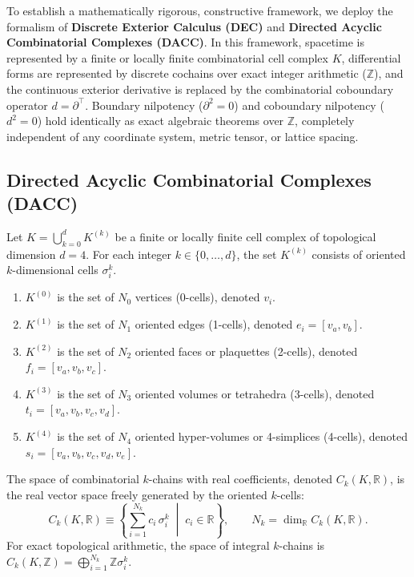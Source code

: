To establish a mathematically rigorous, constructive framework, we deploy the formalism of \textbf{Discrete Exterior Calculus (DEC)} \cite{Desbrun2005} and \textbf{Directed Acyclic Combinatorial Complexes (DACC)}. In this framework, spacetime is represented by a finite or locally finite combinatorial cell complex $K$, differential forms are represented by discrete cochains over exact integer arithmetic ($\mathbb{Z}$), and the continuous exterior derivative is replaced by the combinatorial coboundary operator $d = \partial^\top$. Boundary nilpotency ($\partial^2 = 0$) and coboundary nilpotency ($d^2 = 0$) hold identically as exact algebraic theorems over $\mathbb{Z}$, completely independent of any coordinate system, metric tensor, or lattice spacing.

\subsection{Directed Acyclic Combinatorial Complexes (DACC)}
\label{subsec:dacc_definitions}

\begin{definition}
\label{def:cell_complex}
Let $K = \bigcup_{k=0}^d K^{(k)}$ be a finite or locally finite cell complex of topological dimension $d = 4$. For each integer $k \in \{0, \dots, d\}$, the set $K^{(k)}$ consists of oriented $k$-dimensional cells $\sigma_i^k$. 
\begin{enumerate}
    \item $K^{(0)}$ is the set of $N_0$ vertices (0-cells), denoted $v_i$.
    \item $K^{(1)}$ is the set of $N_1$ oriented edges (1-cells), denoted $e_i = [v_a, v_b]$.
    \item $K^{(2)}$ is the set of $N_2$ oriented faces or plaquettes (2-cells), denoted $f_i = [v_a, v_b, v_c]$.
    \item $K^{(3)}$ is the set of $N_3$ oriented volumes or tetrahedra (3-cells), denoted $t_i = [v_a, v_b, v_c, v_d]$.
    \item $K^{(4)}$ is the set of $N_4$ oriented hyper-volumes or 4-simplices (4-cells), denoted $s_i = [v_a, v_b, v_c, v_d, v_e]$.
\end{enumerate}
The space of combinatorial $k$-chains with real coefficients, denoted $C_k(K, \mathbb{R})$, is the real vector space freely generated by the oriented $k$-cells:
\begin{equation}
\label{eq:k_chains_space}
C_k(K, \mathbb{R}) \equiv \left\{ \sum_{i=1}^{N_k} c_i \, \sigma_i^k \;\middle|\; c_i \in \mathbb{R} \right\}, \qquad N_k = \dim_{\mathbb{R}} C_k(K, \mathbb{R}).
\end{equation}
For exact topological arithmetic, the space of integral $k$-chains is $C_k(K, \mathbb{Z}) = \bigoplus_{i=1}^{N_k} \mathbb{Z} \sigma_i^k$.
\end{definition}


